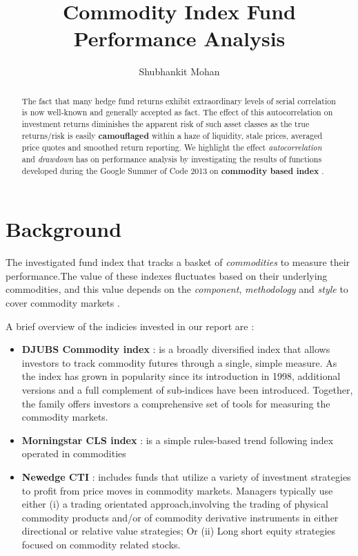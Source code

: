 \documentclass[12pt,letterpaper,english]{article}
\title{Commodity Index Fund Performance Analysis}
\author{Shubhankit Mohan}
\begin{document}


\maketitle


\begin{abstract}
The fact that many hedge fund returns exhibit extraordinary levels of serial correlation is now well-known and generally accepted as fact. The effect of this autocorrelation on investment returns diminishes the apparent risk of such asset classes as the true returns/risk is easily \textbf{camouflaged} within a haze of liquidity, stale prices, averaged price quotes and smoothed return reporting. We highlight the effect \emph{autocorrelation} and \emph{drawdown} has on performance analysis by investigating the results of functions developed during the Google Summer of Code 2013 on \textbf{commodity based index} .
\end{abstract}

\tableofcontents



\section{Background}
The investigated fund index that tracks a basket of \emph{commodities} to measure their performance.The value of these indexes fluctuates based on their underlying commodities, and this value depends on the \emph{component}, \emph{methodology} and \emph{style} to cover commodity markets .

A brief overview of the indicies invested in our report are : 
  \begin{itemize}
    \item
     \textbf{DJUBS Commodity index} :  is a broadly diversified index that allows investors to track commodity futures through a single, simple measure. As the index has grown in popularity since its introduction in 1998, additional versions and a full complement of sub-indices have been introduced. Together, the family offers investors a comprehensive set of tools for measuring the commodity markets.
      \item
 \textbf{Morningstar CLS index} : is a simple rules-based trend following index operated in commodities
   \item
    \textbf{Newedge CTI} :  includes funds that utilize a variety of investment strategies to profit from price moves in commodity markets.
Managers typically use either (i) a trading orientated approach,involving the trading of physical commodity products and/or of commodity
derivative instruments in either directional or relative value strategies; Or (ii) Long short equity strategies focused on commodity related stocks.
  \end{itemize}
  
\end{document}
